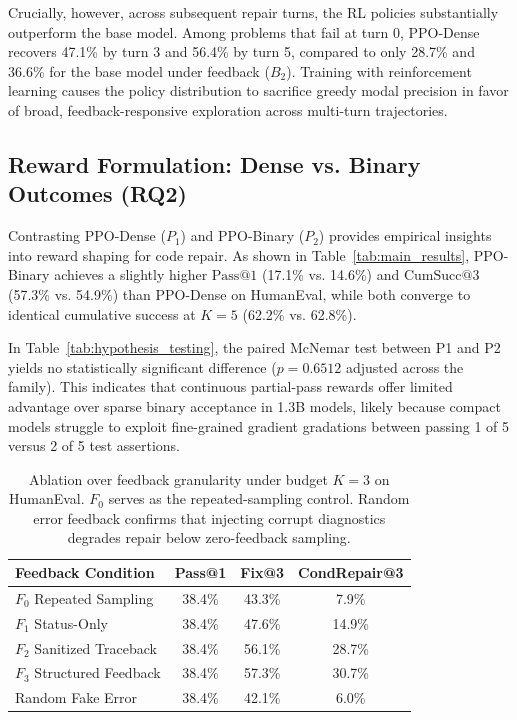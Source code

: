 \documentclass[letterpaper]{article} %
\begin{document}
Crucially, however, across subsequent repair turns, the RL policies substantially outperform the base model. Among problems that fail at turn 0, PPO-Dense recovers 47.1\% by turn 3 and 56.4\% by turn 5, compared to only 28.7\% and 36.6\% for the base model under feedback ($B_2$). Training with reinforcement learning causes the policy distribution to sacrifice greedy modal precision in favor of broad, feedback-responsive exploration across multi-turn trajectories.

\subsection{Reward Formulation: Dense vs. Binary Outcomes (RQ2)}
Contrasting PPO-Dense ($P_1$) and PPO-Binary ($P_2$) provides empirical insights into reward shaping for code repair. As shown in Table~\ref{tab:main_results}, PPO-Binary achieves a slightly higher $\text{Pass@1}$ (17.1\% vs. 14.6\%) and $\text{CumSucc}@3$ (57.3\% vs. 54.9\%) than PPO-Dense on HumanEval, while both converge to identical cumulative success at $K=5$ (62.2\% vs. 62.8\%). 

In Table~\ref{tab:hypothesis_testing}, the paired McNemar test between P1 and P2 yields no statistically significant difference ($p=0.6512$ adjusted across the family). This indicates that continuous partial-pass rewards offer limited advantage over sparse binary acceptance in 1.3B models, likely because compact models struggle to exploit fine-grained gradient gradations between passing 1 of 5 versus 2 of 5 test assertions.

\begin{table}[t]
\centering
\small
\setlength{\tabcolsep}{3.5pt}
\begin{tabular}{lccc}
\toprule
\textbf{Feedback Condition} & \textbf{Pass@1} & \textbf{Fix@3} & \textbf{CondRepair@3} \\
\midrule
$F_0$ Repeated Sampling & 38.4\% & 43.3\% & 7.9\% \\
$F_1$ Status-Only & 38.4\% & 47.6\% & 14.9\% \\
$F_2$ Sanitized Traceback & 38.4\% & 56.1\% & 28.7\% \\
$F_3$ Structured Feedback & 38.4\% & 57.3\% & 30.7\% \\
Random Fake Error & 38.4\% & 42.1\% & 6.0\% \\
\bottomrule
\end{tabular}
\caption{Ablation over feedback granularity under budget $K=3$ on HumanEval. $F_0$ serves as the repeated-sampling control. Random error feedback confirms that injecting corrupt diagnostics degrades repair below zero-feedback sampling.}
\label{tab:feedback_ablation}
\end{table}
\end{document}
